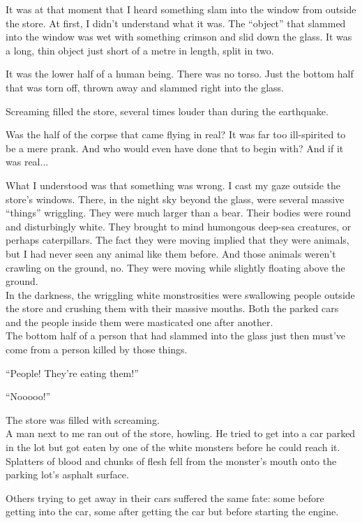 It was at that moment that I heard something slam into the window from outside the store. At first, I didn't understand what it was. The ``object'' that slammed into the window was wet with something crimson and slid down the glass. It was a long, thin object just short of a metre in length, split in two.

It was the lower half of a human being. There was no torso. Just the bottom half that was torn off, thrown away and slammed right into the glass.

Screaming filled the store, several times louder than during the earthquake.

Was the half of the corpse that came flying in real? It was far too ill-spirited to be a mere prank. And who would even have done that to begin with? And if it was real...

What I understood was that something was wrong. I cast my gaze outside the store's windows. There, in the night sky beyond the glass, were several massive ``things'' wriggling. They were much larger than a bear. Their bodies were round and disturbingly white. They brought to mind humongous deep-sea creatures, or perhaps caterpillars. The fact they were moving implied that they were animals, but I had never seen any animal like them before. And those animals weren't crawling on the ground, no. They were moving while slightly floating above the ground.\\
In the darkness, the wriggling white monstrosities were swallowing people outside the store and crushing them with their massive mouths. Both the parked cars and the people inside them were masticated one after another. \\
The bottom half of a person that had slammed into the glass just then must've come from a person killed by those things.

``People! They're eating them!''

``Nooooo!''

The store was filled with screaming.\\
A man next to me ran out of the store, howling. He tried to get into a car parked in the lot but got eaten by one of the white monsters before he could reach it. Splatters of blood and chunks of flesh fell from the monster's mouth onto the parking lot's asphalt surface.

Others trying to get away in their cars suffered the same fate: some before getting into the car, some after getting the car but before starting the engine.

